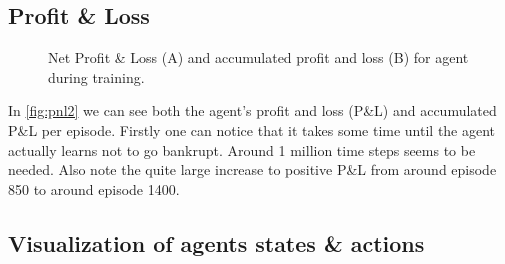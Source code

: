 \documentclass{kththesis}
\theoremstyle{definition}
\begin{document}
%		

\subsection*{Profit \& Loss}

\begin{figure}[H]
    \centering
    
    \caption{Net Profit \& Loss (A) and accumulated profit and loss (B) for agent during training.}
    \label{fig:pnl2}
\end{figure}
In \autoref{fig:pnl2} we can see both the agent's profit and loss (P\&L) and accumulated P\&L per episode. Firstly one can notice that it takes some time until the agent actually learns not to go bankrupt. Around 1 million time steps seems to be needed. Also note the quite large increase to positive P\&L from around episode 850 to around episode 1400. 


%		

\subsection*{Visualization of agents states \& actions}
\end{document}
